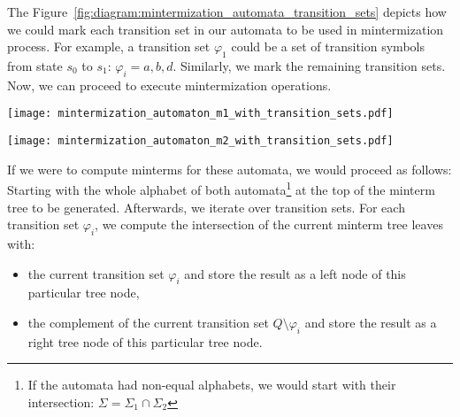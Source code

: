 The Figure~\ref{fig:diagram:mintermization_automata_transition_sets} depicts how we could mark each transition set in our automata to be used in mintermization process. For example, a transition set $\varphi_1$ could be a set of transition symbols from state $s_0$ to $s_1$: $\varphi_i = {a, b, d}$. Similarly, we mark the remaining transition sets. Now, we can proceed to execute mintermization operations.

\begin{figure*}[ht]
    \centering
    \begin{minipage}{0.49\linewidth}
        \centering
        \texttt{[image: mintermization\_automaton\_m1\_with\_transition\_sets.pdf]}
        \caption{Finite automaton $M_1$ with transition sets $\varphi_i$.}
        \label{fig:diagram:mintermization_automaton_m1_with_transition_sets}
    \end{minipage}
    \hfill
    \begin{minipage}{0.49\linewidth}
        \centering
        \texttt{[image: mintermization\_automaton\_m2\_with\_transition\_sets.pdf]}
        \caption{Finite automaton $M_2$ with transition sets $\varphi_i$.}
        \label{fig:diagram:mintermization_automaton_m2_with_transition_sets}
    \end{minipage}
    \vspace{0.5cm}
    \caption{Finite automata $M_1$ and $M_2$ with marked transition sets used in mintermization.}
    \label{fig:diagram:mintermization_automata_transition_sets}
\end{figure*}

If we were to compute minterms for these automata, we would proceed as follows: Starting with the whole alphabet of both automata\footnote{If the automata had non-equal alphabets, we would start with their intersection: $\Sigma = \Sigma_1 \cap \Sigma_2$} at the top of the minterm tree to be generated. Afterwards, we iterate over transition sets. For each transition set $\varphi_i$, we compute the intersection of the current minterm tree leaves with:
\begin{itemize}
    \item the current transition set $\varphi_i$ and store the result as a left node of this particular tree node,
    \item the complement of the current transition set $Q \setminus \varphi_i$ and store the result as a right tree node of this particular tree node.
\end{itemize}

